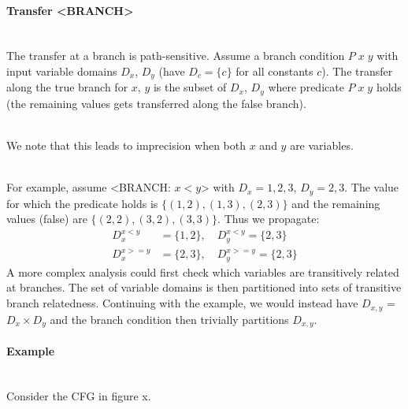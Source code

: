 \documentclass[a4paper]{article}
\newcommand{\NL}[0]{ \hfill\\\noindent }
\begin{document}
\paragraph{Transfer <BRANCH>}\NL
The transfer at a branch is path-sensitive. Assume a branch condition $P\;x\;y$ with input variable domains $D_x$, $D_y$ (have $D_c = \{c\}$ for all constants $c$).  The transfer along the true branch for $x$, $y$ is the subset of $D_x$, $D_y$ where predicate $P\;x\;y$ holds (the remaining values gets transferred along the false branch).

\NL
We note that this leads to imprecision when both $x$ and $y$ are variables. 

\NL
For example, assume <BRANCH: $x < y$> with $D_x = {1,2,3}$, $D_y = {2,3}$. The value for which the predicate holds is $\{(1,2), (1,3), (2,3)\}$ and the remaining values (false) are $\{(2,2), (3,2), (3,3)\}$. Thus we propagate:
\begin{align*}
D_x^{x < y} &= \{1, 2\} , \quad D_y^{x < y}  = \{2,3\} \\
D_x^{x >= y} &= \{2,3\} , \quad D_y^{x >= y} = \{2,3\} 
\end{align*}
\noindent
A more complex analysis could first check which variables are transitively related at branches. The set of variable domains is then partitioned into sets of transitive branch relatedness. Continuing with the example, we would instead have $D_{x,y}$ = $D_x \times D_y$ and the branch condition then trivially partitions $D_{x,y}$. 

\paragraph{Example}\NL
Consider the CFG in figure x.




%
%
%
%
%
\end{document}
